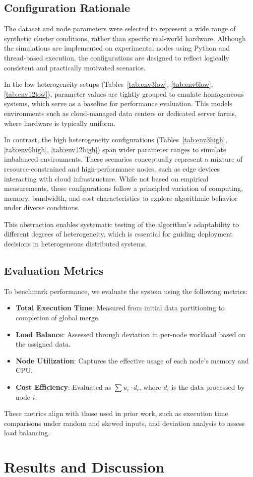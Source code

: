 \documentclass[]{interact}
\theoremstyle{plain}
\theoremstyle{definition}
\theoremstyle{remark}
\begin{document}
\subsection{Configuration Rationale}

The dataset and node parameters were selected to represent a wide range of synthetic cluster conditions, rather than specific real-world hardware. Although the simulations are implemented on experimental nodes using Python and thread-based execution, the configurations are designed to reflect logically consistent and practically motivated scenarios.

In the low heterogeneity setups (Tables~\ref{tab:env3low}, \ref{tab:env6low}, \ref{tab:env12low}), parameter values are tightly grouped to emulate homogeneous systems, which serve as a baseline for performance evaluation. This models environments such as cloud-managed data centers or dedicated server farms, where hardware is typically uniform.

In contrast, the high heterogeneity configurations (Tables~\ref{tab:env3high}, \ref{tab:env6high}, \ref{tab:env12high}) span wider parameter ranges to simulate imbalanced environments. These scenarios conceptually represent a mixture of resource-constrained and high-performance nodes, such as edge devices interacting with cloud infrastructure. While not based on empirical measurements, these configurations follow a principled variation of computing, memory, bandwidth, and cost characteristics to explore algorithmic behavior under diverse conditions.

This abstraction enables systematic testing of the algorithm's adaptability to different degrees of heterogeneity, which is essential for guiding deployment decisions in heterogeneous distributed systems.


\subsection{Evaluation Metrics}
To benchmark performance, we evaluate the system using the following metrics:
\begin{itemize}
\item \textbf{Total Execution Time}: Measured from initial data partitioning to completion of global merge.
\item \textbf{Load Balance}: Assessed through deviation in per-node workload based on the assigned data.
\item \textbf{Node Utilization}: Captures the effective usage of each node’s memory and CPU.
\item \textbf{Cost Efficiency}: Evaluated as $\sum u_i \cdot d_i$, where $d_i$ is the data processed by node $i$.
\end{itemize}

These metrics align with those used in prior work, such as execution time comparisons under random and skewed inputs, and deviation analysis to assess load balancing.


\section{Results and Discussion}
\end{document}
